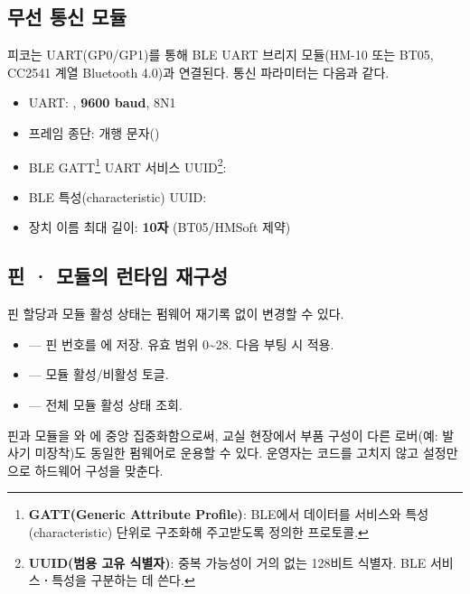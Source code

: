 \subsection{무선 통신 모듈}

피코는 UART(GP0/GP1)를 통해 BLE UART 브리지 모듈(HM-10 또는 BT05,
CC2541 계열 Bluetooth 4.0)과 연결된다. 통신 파라미터는 다음과 같다.

\begin{itemize}
  \item UART: , \textbf{9600 baud}, 8N1
  \item 프레임 종단: 개행 문자()
  \item BLE GATT\footnote{\textbf{GATT(Generic Attribute Profile)}: BLE에서 데이터를 서비스와
        특성(characteristic) 단위로 구조화해 주고받도록 정의한 프로토콜.} UART 서비스
        UUID\footnote{\textbf{UUID(범용 고유 식별자)}: 중복 가능성이 거의 없는 128비트 식별자.
        BLE 서비스\textbf{·}특성을 구분하는 데 쓴다.}: 
  \item BLE 특성(characteristic) UUID: 
  \item 장치 이름 최대 길이: \textbf{10자} (BT05/HMSoft 제약)
\end{itemize}

\subsection{핀 \textbf{·} 모듈의 런타임 재구성}

핀 할당과 모듈 활성 상태는 펌웨어 재기록 없이 변경할 수 있다.

\begin{itemize}
  \item {} --- 핀 번호를 에 저장.
        유효 범위 0\textasciitilde 28. 다음 부팅 시 적용.
  \item {} --- 모듈 활성/비활성 토글.
  \item {} --- 전체 모듈 활성 상태 조회.
\end{itemize}

\begin{infobox}[title=설계 의도]
핀과 모듈을 와 에 중앙 집중화함으로써, 교실
현장에서 부품 구성이 다른 로버(예: 발사기 미장착)도 동일한 펌웨어로 운용할 수
있다. 운영자는 코드를 고치지 않고 설정만으로 하드웨어 구성을 맞춘다.
\end{infobox}

